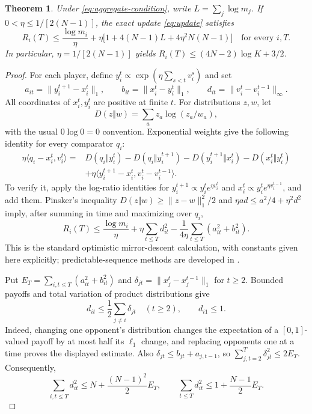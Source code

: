 \documentclass[11pt]{article}
\newtheorem{theorem}{Theorem}
\newcommand{\ip}[2]{\langle #1,#2\rangle}
\newcommand{\norm}[1]{\lVert #1\rVert}
\begin{document}
\begin{theorem}\label{thm:aggregate}
Under \eqref{eq:aggregate-condition}, write
$L=\sum_j\log m_j$. If $0<\eta\leq1/[2(N-1)]$, the exact update
\eqref{eq:update} satisfies
\begin{equation}\label{eq:aggregate-bound}
 R_i(T)\leq\frac{\log m_i}{\eta}
 +\eta\bigl[1+4(N-1)L+4\eta^2N(N-1)\bigr]
 \quad\text{for every }i,T.
\end{equation}
In particular, $\eta=1/[2(N-1)]$ yields
$R_i(T)\leq(4N-2)\log K+3/2$.
\end{theorem}

\begin{proof}
For each player, define
$y_i^t\propto\exp(\eta\sum_{s<t}v_i^s)$ and set
\[
 a_{it}=\norm{y_i^{t+1}-x_i^t}_1,\qquad
 b_{it}=\norm{x_i^t-y_i^t}_1,\qquad
 d_{it}=\norm{v_i^t-v_i^{t-1}}_\infty.
\]
All coordinates of $x_i^t,y_i^t$ are positive at finite $t$.
For distributions $z,w$, let
\[
D(z\Vert w)=\sum_a z_a\log(z_a/w_a),
\]
with the usual $0\log0=0$ convention. Exponential weights give the
following identity for every comparator $q_i$:
\begin{align*}
 \eta\ip{q_i-x_i^t}{v_i^t}
 ={}&D(q_i\Vert y_i^t)-D(q_i\Vert y_i^{t+1})
 -D(y_i^{t+1}\Vert x_i^t)-D(x_i^t\Vert y_i^t)\\
 &+\eta\ip{y_i^{t+1}-x_i^t}{v_i^t-v_i^{t-1}}.
\end{align*}
To verify it, apply the log-ratio identities for
$y_i^{t+1}\propto y_i^t e^{\eta v_i^t}$ and
$x_i^t\propto y_i^t e^{\eta v_i^{t-1}}$, and add them.
Pinsker's inequality $D(z\Vert w)\geq\norm{z-w}_1^2/2$ and
$\eta a d\leq a^2/4+\eta^2d^2$ imply, after summing in time and maximizing
over $q_i$,
\begin{equation}\label{eq:rvu-l1}
 R_i(T)\leq\frac{\log m_i}{\eta}
 +\eta\sum_{t\leq T}d_{it}^2
 -\frac1{4\eta}\sum_{t\leq T}(a_{it}^2+b_{it}^2).
\end{equation}
This is the standard optimistic mirror-descent calculation, with constants
given here explicitly; predictable-sequence methods are developed in
\cite{rs}.

Put $E_T=\sum_{i,t\leq T}(a_{it}^2+b_{it}^2)$ and
$\delta_{jt}=\norm{x_j^t-x_j^{t-1}}_1$ for $t\geq2$.
Bounded payoffs and total variation of product distributions give
\[
 d_{it}\leq\frac12\sum_{j\ne i}\delta_{jt}\quad(t\geq2),
 \qquad d_{i1}\leq1.
\]
Indeed, changing one opponent's distribution changes the expectation of a
$[0,1]$-valued payoff by at most half its $\ell_1$ change, and replacing
opponents one at a time proves the displayed estimate.
Also $\delta_{jt}\leq b_{jt}+a_{j,t-1}$, so
$\sum_{j,t=2}^T\delta_{jt}^2\leq2E_T$. Consequently,
\begin{equation}\label{eq:all-feedback}
 \sum_{i,t\leq T}d_{it}^2
 \leq N+\frac{(N-1)^2}{2}E_T,
 \qquad
 \sum_{t\leq T}d_{it}^2
 \leq1+\frac{N-1}{2}E_T.
\end{equation}


\end{proof}
\end{document}
